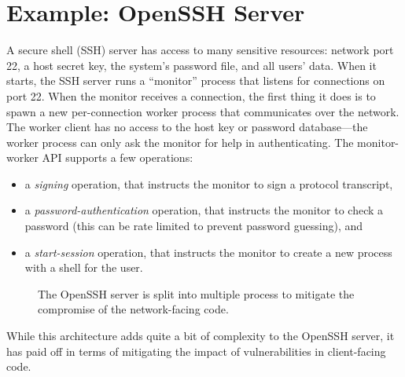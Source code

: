 \documentclass[
  letterpaper,
]{scrbook}
\providecommand{\tightlist}{%
  \setlength{\itemsep}{0pt}\setlength{\parskip}{0pt}}
\theoremstyle{definition}
\theoremstyle{plain}
\theoremstyle{plain}
\theoremstyle{remark}
\begin{document}
\section{Example: OpenSSH Server}\label{example-openssh-server}

A secure shell (SSH) server has access to many sensitive resources:
network port 22, a host secret key, the system's password file, and all
users' data. When it starts, the SSH server runs a ``monitor'' process
that listens for connections on port 22. When the monitor receives a
connection, the first thing it does is to spawn a new per-connection
worker process that communicates over the network. The worker client has
no access to the host key or password database---the worker process can
only ask the monitor for help in authenticating. The monitor-worker API
supports a few operations:

\begin{itemize}
\tightlist
\item
  a \emph{signing} operation, that instructs the monitor to sign a
  protocol transcript,
\item
  a \emph{password-authentication} operation, that instructs the monitor
  to check a password (this can be rate limited to prevent password
  guessing), and
\item
  a \emph{start-session} operation, that instructs the monitor to create
  a new process with a shell for the user.
\end{itemize}

\begin{figure}


\caption{\label{fig-openssh}The OpenSSH server is split into multiple
process to mitigate the compromise of the network-facing code.}

\end{figure}%

While this architecture adds quite a bit of complexity to the OpenSSH
server, it has paid off in terms of mitigating the impact of
vulnerabilities in client-facing code.
\end{document}
